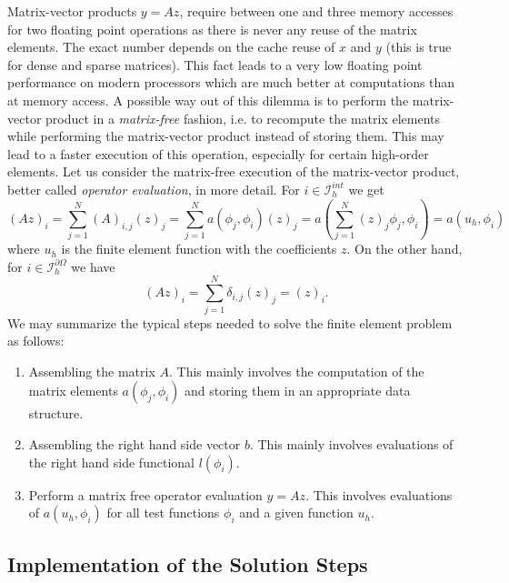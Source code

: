 \documentclass[a4paper,12pt]{article}
\begin{document}
Matrix-vector products $y=Az$, require between one and three memory accesses for two
floating point operations as there is never any reuse of the matrix elements.
The exact number depends on the cache reuse of $x$ and $y$ (this is true for
dense and sparse matrices). This fact leads to a very low floating point performance
on modern processors which are much better at computations than at memory access.
A possible way out of this dilemma is to perform the matrix-vector  product in a
{\em matrix-free} fashion, i.e. to recompute the matrix elements while performing
the matrix-vector product instead of storing them. This may lead to a faster 
execution of this operation, especially for certain high-order elements.
Let us consider the matrix-free execution of the matrix-vector product, 
better called {\em operator evaluation}, in more detail.
For $i\in\mathcal{I}_h^{int}$ we get
\begin{equation}
(Az)_i = \sum_{j=1}^N (A)_{i,j} (z)_j = \sum_{j=1}^N a(\phi_j,\phi_i) (z)_j = 
 a\left(\sum_{j=1}^N (z)_j\phi_j,\phi_i\right) = a(u_h,\phi_i) 
\label{eq:opeval}
\end{equation}
where $u_h$ is the finite element function with the coefficients $z$. On the other
hand, for $i\in\mathcal{I}_h^{\partial\Omega}$ we have
\begin{equation*}
(Az)_i = \sum_{j=1}^N \delta_{i,j} (z)_j = (z)_i .
\end{equation*}
We may summarize the typical steps needed to solve the 
finite element problem as follows:
\begin{enumerate}[1)]
\item Assembling the matrix $A$. This mainly involves the computation of the matrix
elements $a(\phi_j,\phi_i)$ and storing them in an appropriate data structure.
\item Assembling the right hand side vector $b$. This mainly involves evaluations of
the right hand side functional $l(\phi_i)$.
\item Perform a matrix free operator evaluation $y=Az$. This involves evaluations
of $a(u_h,\phi_i)$ for all test functions $\phi_i$ and a given function $u_h$.
\end{enumerate}

\subsection{Implementation of the Solution Steps}\label{subs:impl}
\end{document}
